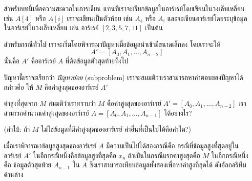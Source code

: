 สำหรับ{\wbr}บท{\wbr}นี้{\wbr}เพื่อ{\wbr}ความ{\wbr}สะดวก{\wbr}ใน{\wbr}การ{\wbr}เขียน{\wbr}
แทน{\wbr}ที่{\wbr}เรา{\wbr}จะ{\wbr}เรียก{\wbr}ข้อมูล{\wbr}ใน{\wbr}อาร์เรย์{\wbr}โดย{\wbr}เขียน{\wbr}ใน{\wbr}วงเล็บ{\wbr}เหลี่ยม เช่น $A[4]$ หรือ $A[i]$
เรา{\wbr}จะ{\wbr}เขียน{\wbr}เป็น{\wbr}ตัว{\wbr}ห้อย เช่น $A_4$ หรือ $A_i$
และ{\wbr}จะ{\wbr}เขียน{\wbr}อาร์เรย์{\wbr}โดย{\wbr}ระบุ{\wbr}ข้อมูล{\wbr}ใน{\wbr}อาร์เรย์{\wbr}ใน{\wbr}วงเล็บ{\wbr}เหลี่ยม เช่น อาร์เรย์
$[2,3,5,7,11]$ เป็นต้น{\wbr}

สำหรับ{\wbr}กรณี{\wbr}ทั่วไป เรา{\wbr}จะ{\wbr}เริ่ม{\wbr}โดย{\wbr}พิจารณา{\wbr}ปัญหา{\wbr}เมื่อ{\wbr}ข้อมูล{\wbr}นำเข้า{\wbr}มี{\wbr}ขนาด{\wbr}เล็ก{\wbr}ลง โดย{\wbr}เรา{\wbr}จะ{\wbr}ให้{\wbr}
\[
A' = [A_0,A_1,\ldots,A_{n-2}]
\]
นั่น{\wbr}คือ $A'$ คือ{\wbr}อาร์เรย์ $A$ ที่{\wbr}ตัด{\wbr}ข้อมูล{\wbr}ตัว{\wbr}สุดท้าย{\wbr}ทิ้ง{\wbr}ไป{\wbr}

ปัญหา{\wbr}นี้{\wbr}เรา{\wbr}จะ{\wbr}เรียก{\wbr}ว่า {\em ปัญหา{\wbr}ย่อย} (subproblem)
เรา{\wbr}จะ{\wbr}สมมติ{\wbr}ว่า{\wbr}เรา{\wbr}สามารถ{\wbr}หา{\wbr}คำตอบ{\wbr}ของ{\wbr}ปัญหา{\wbr}ได้ กล่าวคือ{\wbr}
ให้ $M$ คือ{\wbr}ค่าสูงสุด{\wbr}ของ{\wbr}อาร์เรย์ $A'$

\begin{quiz}{ค่า{\wbr}สูง{\wbr}ที่สุด{\wbr}จาก $M$}
สมมติ{\wbr}ว่า{\wbr}เรา{\wbr}ทราบ{\wbr}ว่า $M$ คือ{\wbr}ค่าสูงสุด{\wbr}ของ{\wbr}อาร์เรย์ $A'= [A_0,A_1,\ldots,A_{n-2}]$
เรา{\wbr}สามารถ{\wbr}คำนวณ{\wbr}ค่าสูงสุด{\wbr}ของ{\wbr}อาร์เรย์ 
$A= [A_0,A_1,\ldots,A_{n-1}]$
ได้{\wbr}อย่างไร?

(คำ{\wbr}ใบ้: ถ้า $M$ ไม่{\wbr}ใช่{\wbr}ข้อมูล{\wbr}ที่{\wbr}มี{\wbr}ค่าสูงสุด{\wbr}ของ{\wbr}อาร์เรย์ ค่า{\wbr}อื่น{\wbr}ที่{\wbr}เป็น{\wbr}ไป{\wbr}ได้{\wbr}คือ{\wbr}ค่า{\wbr}ใด?)
\end{quiz}

เมื่อ{\wbr}เรา{\wbr}พิจารณา{\wbr}ข้อมูล{\wbr}สูงสุด{\wbr}ของ{\wbr}อาร์เรย์ $A$ มี{\wbr}ความ{\wbr}เป็น{\wbr}ไป{\wbr}ได้{\wbr}สอง{\wbr}กรณี{\wbr}คือ{\wbr}
กรณี{\wbr}ที่{\wbr}ข้อมูล{\wbr}สูง{\wbr}ที่สุด{\wbr}อยู่{\wbr}ใน{\wbr}อาร์เรย์ $A'$ ใน{\wbr}อีก{\wbr}กรณี{\wbr}หนึ่ง{\wbr}คือ{\wbr}ข้อมูล{\wbr}สูง{\wbr}ที่สุด{\wbr}คือ $x_n$
ถ้า{\wbr}เป็น{\wbr}ใน{\wbr}กรณี{\wbr}แรก{\wbr}ค่าสูงสุด{\wbr}คือ $M$ ใน{\wbr}อีก{\wbr}กรณี{\wbr}หนึ่ง{\wbr}คือ ข้อมูล{\wbr}ตัว{\wbr}สุดท้าย $A_{n-1}$ ใน $A$
ซึ่ง{\wbr}เรา{\wbr}สามารถ{\wbr}เทียบ{\wbr}ข้อมูล{\wbr}ทั้ง{\wbr}สอง{\wbr}เพื่อ{\wbr}หา{\wbr}ค่า{\wbr}สูง{\wbr}ที่สุด{\wbr}ได้ ดัง{\wbr}อัล{\wbr}กอ{\wbr}ริ{\wbr}ทึม{\wbr}ด้าน{\wbr}ล่าง{\wbr}

